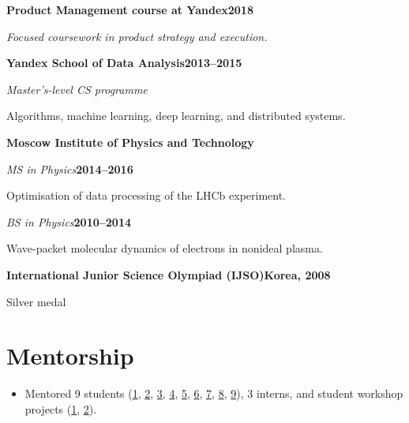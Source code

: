 \documentclass[11pt,a4paper]{article}
\newlength{\projindent}\setlength{\projindent}{1.3em}
\begin{document}
\textbf{Product Management course at Yandex}\hfill\textbf{2018}\par
\textit{Focused coursework in product strategy and execution.}\par
\smallskip

\textbf{Yandex School of Data Analysis}\hfill\textbf{2013--2015}\par
\textit{Master's-level CS programme}\par
{\leftskip\projindent Algorithms, machine learning, deep learning, and distributed systems.\par}
\smallskip

\textbf{Moscow Institute of Physics and Technology}\par
\textit{MS in Physics}\hfill\textbf{2014--2016}\par
{\leftskip\projindent Optimisation of data processing of the LHCb experiment.\par}
\textit{BS in Physics}\hfill\textbf{2010--2014}\par
{\leftskip\projindent Wave-packet molecular dynamics of electrons in nonideal plasma.\par}
\smallskip

\textbf{International Junior Science Olympiad (IJSO)}\hfill\textbf{Korea, 2008}\par
{\leftskip\projindent Silver medal\par}
\smallskip


\section{Mentorship}
\begin{itemize}
  \item Mentored 9 students (\href{https://www.hse.ru/edu/vkr/219430466}{1}, \href{https://www.hse.ru/edu/vkr/296294066}{2}, \href{https://www.hse.ru/edu/vkr/219524130}{3}, \href{https://www.hse.ru/en/edu/vkr/470561417}{4}, \href{https://www.hse.ru/en/edu/vkr/470935224}{5}, \href{https://www.hse.ru/ma/datasci/students/diplomas/631565328}{6}, \href{https://www.hse.ru/ma/datasci/students/diplomas/631565422}{7}, \href{https://www.hse.ru/edu/vkr/624890096}{8}, \href{https://www.hse.ru/ba/ami/students/diplomas/834351454}{9}), 3 interns, and student workshop projects (\href{https://sochisirius.ru/news/3148}{1}, \href{https://web.archive.org/web/20220512040654/https://academy.yandex.ru/posts/vossozdat-arkhitekturu-bazy-dannykh-i-nauchit-golosovogo-pomoschnika-predskazyvat-namereniya-polzovatelya}{2}).
\end{itemize}
\end{document}
